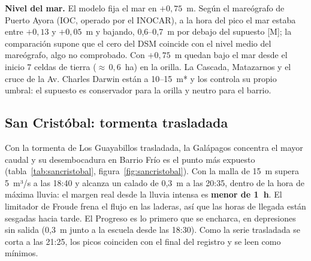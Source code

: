 \documentclass{sosg-informe}
\begin{document}
\textbf{Nivel del mar.} El modelo fija el mar en $+0,75$~m. Según el mareógrafo de Puerto Ayora (IOC, operado por el INOCAR), a la hora del pico el mar estaba entre $+0,13$ y $+0,05$~m y bajando, 0,6--0,7~m por debajo del supuesto [M]; la comparación supone que el cero del DSM coincide con el nivel medio del mareógrafo, algo no comprobado. Con $+0,75$~m quedan bajo el mar desde el inicio 7 celdas de tierra (${\approx}\,0,6$~ha) en la orilla. La Cascada, Matazarnos y el cruce de la Av. Charles Darwin están a 10--15~m* y los controla su propio umbral: el supuesto es conservador para la orilla y neutro para el barrio.

\subsection{San Cristóbal: tormenta trasladada}
Con la tormenta de Los Guayabillos trasladada, la Galápagos concentra el mayor caudal y su desembocadura en Barrio Frío es el punto más expuesto (tabla~\ref{tab:sancristobal}, figura~\ref{fig:sancristobal}). Con la malla de 15~m supera 5~m³/s a las 18:40 y alcanza un calado de 0,3~m a las 20:35, dentro de la hora de máxima lluvia: el margen real desde la lluvia intensa es \textbf{menor de 1~h}. El limitador de Froude frena el flujo en las laderas, así que las horas de llegada están sesgadas hacia tarde. El Progreso es lo primero que se encharca, en depresiones sin salida (0,3~m junto a la escuela desde las 18:30). Como la serie trasladada se corta a las 21:25, los picos coinciden con el final del registro y se leen como mínimos.
\end{document}
